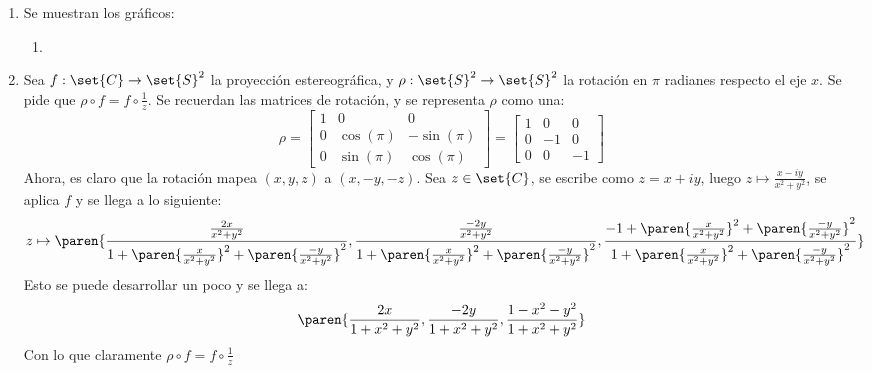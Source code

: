 \documentclass{homework}
\begin{document}
\begin{sol}
    \begin{enumerate}[label=(\alph*)]
        \item Se muestran los gráficos:
              \begin{enumerate}[label=(\roman*)]
                  \item
              \end{enumerate}
        \item Sea \(f:\set{C}\rightarrow\set{S}^2\) la proyección estereográfica, y \(\rho:\set{S}^2\rightarrow\set{S}^2\) la rotación en \(\pi\) radianes respecto el eje \(x\). Se pide que \(\rho\circ f=f\circ\frac1z\). Se recuerdan las matrices de rotación, y se representa \(\rho\) como una:
              \[\rho=\begin{bmatrix}
                      1 & 0         & 0          \\
                      0 & \cos(\pi) & -\sin(\pi) \\
                      0 & \sin(\pi) & \cos(\pi)
                  \end{bmatrix}=\begin{bmatrix}
                      1 & 0  & 0  \\
                      0 & -1 & 0  \\
                      0 & 0  & -1
                  \end{bmatrix}\]
              Ahora, es claro que la rotación mapea \((x,y,z)\) a \((x,-y,-z)\). Sea \(z\in\set{C}\), se escribe como \(z=x+iy\), luego \(z\mapsto\frac{x-iy}{x^2+y^2}\), se aplica \(f\) y se llega a lo siguiente:
              \begin{equation*}
                  z\mapsto\paren{\frac{\frac{2x}{x^2+y^2}}{1+\paren{\frac{x}{x^2+y^2}}^2+\paren{\frac{-y}{x^2+y^2}}^2},\frac{\frac{-2y}{x^2+y^2}}{1+\paren{\frac{x}{x^2+y^2}}^2+\paren{\frac{-y}{x^2+y^2}}^2},\frac{-1+\paren{\frac{x}{x^2+y^2}}^2+\paren{\frac{-y}{x^2+y^2}}^2}{1+\paren{\frac{x}{x^2+y^2}}^2+\paren{\frac{-y}{x^2+y^2}}^2}}
              \end{equation*}
              Esto se puede desarrollar un poco y se llega a:
              \begin{equation*}
                  \paren{\frac{2x}{1+x^2+y^2},\frac{-2y}{1+x^2+y^2},\frac{1-x^2-y^2}{1+x^2+y^2}}
              \end{equation*}
              Con lo que claramente \(\rho\circ f=f\circ\frac1z\)
    \end{enumerate}
\end{sol}
\end{document}
